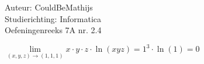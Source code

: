 \documentclass[a4paper]{article}
\newcommand{\llim}{\lim\limits}
\begin{document}
  
\noindent \large Auteur: CouldBeMathijs \\
\noindent \large Studierichting: Informatica\\
\noindent \large Oefeningenreeks 7A nr. 2.4\\

\medskip

\normalsize

$\llim_{(x,y,z) \rightarrow (1,1,1)} x \cdot y \cdot z \cdot \ln(xyz) = 1^3 \cdot \ln(1) = 0$

\begin{thebibliography}{999}
\end{thebibliography}
\end{document}
